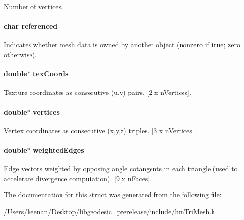 Number of vertices. 

\hypertarget{structhm_tri_mesh_a5f56e97a848fcd2451e252052138215d}{
\paragraph[{referenced}]{\setlength{\rightskip}{0pt plus 5cm}char referenced}}\label{structhm_tri_mesh_a5f56e97a848fcd2451e252052138215d}


Indicates whether mesh data is owned by another object (nonzero if true; zero otherwise). 

\hypertarget{structhm_tri_mesh_a69706f0bd58d8a3dbbb6c7331ca795c4}{
\paragraph[{tex\-Coords}]{\setlength{\rightskip}{0pt plus 5cm}double$\ast$ tex\-Coords}}\label{structhm_tri_mesh_a69706f0bd58d8a3dbbb6c7331ca795c4}


Texture coordinates as consecutive (u,v) pairs. \mbox{[}2 x n\-Vertices\mbox{]}. 

\hypertarget{structhm_tri_mesh_a7374e0ae5c0af9c7c42f1293643c691e}{
\paragraph[{vertices}]{\setlength{\rightskip}{0pt plus 5cm}double$\ast$ vertices}}\label{structhm_tri_mesh_a7374e0ae5c0af9c7c42f1293643c691e}


Vertex coordinates as consecutive (x,y,z) triples. \mbox{[}3 x n\-Vertices\mbox{]}. 

\hypertarget{structhm_tri_mesh_a3602657e0543d44e6b366826f4fafdfc}{
\paragraph[{weighted\-Edges}]{\setlength{\rightskip}{0pt plus 5cm}double$\ast$ weighted\-Edges}}\label{structhm_tri_mesh_a3602657e0543d44e6b366826f4fafdfc}


Edge vectors weighted by opposing angle cotangents in each triangle (used to accelerate divergence computation). \mbox{[}9 x n\-Faces\mbox{]}. 



The documentation for this struct was generated from the following file\-:\begin{DoxyCompactItemize}
\item 
/\-Users/keenan/\-Desktop/libgeodesic\-\_\-prerelease/include/\hyperlink{hm_tri_mesh_8h}{hm\-Tri\-Mesh.\-h}\end{DoxyCompactItemize}
